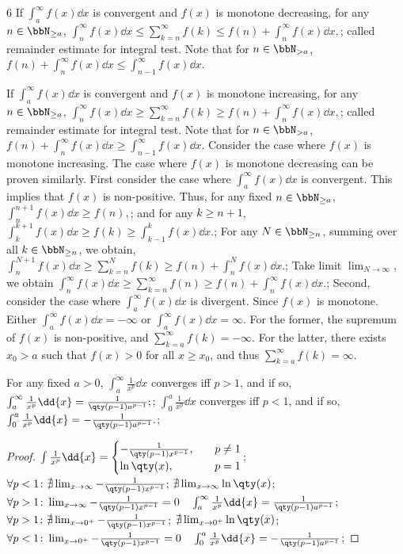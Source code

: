 \documentclass[a4paper,10pt]{extarticle}
\begin{document}
\begin{multicols}{6}
If $\int_a^{\infty}f(x)\dd{x}$ is convergent and $f(x)$ is monotone decreasing, for any $n\in\bbN_{\ge a}$,
\(\int_n^{\infty}f(x)\dd{x}\le\sum_{k=n}^{\infty}f(k)\le f(n)+\int_n^{\infty}f(x)\dd{x},\); 
called remainder estimate for integral test. Note that for $n\in\bbN_{>a}$, $f(n)+\int_n^{\infty}f(x)\dd{x}\le\int_{n-1}^{\infty}f(x)\dd{x}$.

If $\int_a^{\infty}f(x)\dd{x}$ is convergent and $f(x)$ is monotone increasing, for any $n\in\bbN_{\ge a}$,
\(\int_n^{\infty}f(x)\dd{x}\ge\sum_{k=n}^{\infty}f(k)\ge f(n)+\int_n^{\infty}f(x)\dd{x},\); 
called remainder estimate for integral test. Note that for $n\in\bbN_{>a}$, $f(n)+\int_n^{\infty}f(x)\dd{x}\ge\int_{n-1}^{\infty}f(x)\dd{x}$.
\bpr
Consider the case where $f(x)$ is monotone increasing. The case where $f(x)$ is monotone decreasing can be proven similarly. First consider the case where $\int_a^{\infty}f(x)\dd{x}$ is convergent. This implies that $f(x)$ is non-positive. Thus, for any fixed $n\in\bbN_{\ge a}$,
\(\int_n^{n+1}f(x)\dd{x}\ge f(n),\); 
and for any $k\geq n+1$,
\(\int_k^{k+1}f(x)\dd{x}\ge f(k)\ge\int_{k-1}^kf(x)\dd{x}.\); 
For any $N\in\bbN_{\ge n}$, summing over all $k\in\bbN_{\ge n}$, we obtain, 
\(\int_n^{N+1}f(x)\dd{x}\ge\sum_{k=n}^Nf(k)\ge f(n)+\int_n^Nf(x)\dd{x}.\); 
Take limit $\lim_{N\to\infty}$, we obtain
\(\int_n^{\infty}f(x)\dd{x}\ge\sum_{k=n}^{\infty}f(n)\ge f(n)+\int_n^{\infty}f(x)\dd{x}.\); 
Second, consider the case where $\int_a^{\infty}f(x)\dd{x}$ is divergent. Since $f(x)$ is monotone. Either $\int_a^{\infty}f(x)\dd{x}=-\infty$ or $\int_a^{\infty}f(x)\dd{x}=\infty$. For the former, the supremum of $f(x)$ is non-positive, and $\sum_{k=a}^{\infty}f(k)=-\infty$. For the latter, there exists $x_0>a$ such that $f(x)>0$ for all $x\ge x_0$, and thus $\sum_{k=a}^{\infty}f(k)=\infty$.
\epr


For any fixed $a>0$, $\int_a^{\infty}\frac{1}{x^p}\dd{x}$ converges iff $p>1$, and if so,
\(\int_a^{\infty}\frac{1}{x^p}\dd{x}=\frac{1}{\qty(p-1)a^{p-1}};\); 
$\int_0^a\frac{1}{x^p}\dd{x}$ converges iff $p<1$, and if so,
\(\int_0^a\frac{1}{x^p}\dd{x}=-\frac{1}{\qty(p-1)a^{p-1}}.\); 
\begin{proof}
\(\int\frac{1}{x^p}\dd{x}=\begin{cases}
-\frac{1}{\qty(p-1)x^{p-1}},\quad&p\neq 1\\
\ln\qty(x),\quad&p=1
\end{cases}\); 
\(\forall p<1\colon\nexists\lim_{x\to\infty}-\frac{1}{\qty(p-1)x^{p-1}}\); 
\(\nexists\lim_{x\to\infty}\ln\qty(x)\); 
\(\forall p>1\colon\lim_{x\to\infty}-\frac{1}{\qty(p-1)x^{p-1}}=0\quad\int_a^{\infty}\frac{1}{x^p}\dd{x}=\frac{1}{\qty(p-1)a^{p-1}}\); 
\(\forall p>1\colon\nexists\lim_{x\to 0^+}-\frac{1}{\qty(p-1)x^{p-1}}\); 
\(\nexists\lim_{x\to 0^+}\ln\qty(x)\); 
\(\forall p<1\colon\lim_{x\to 0^+}-\frac{1}{\qty(p-1)x^{p-1}}=0\quad\int_0^a\frac{1}{x^p}\dd{x}=-\frac{1}{\qty(p-1)a^{p-1}}\); 
\end{proof}


\end{multicols}
\end{document}
